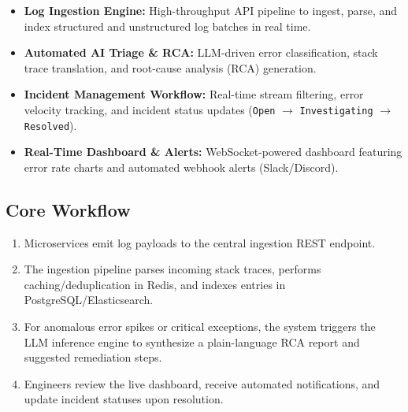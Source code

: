 \documentclass[11pt,a4paper]{article}
\begin{document}
\begin{itemize}[leftmargin=0.7cm]

\item \textbf{Log Ingestion Engine:} High-throughput API pipeline to ingest, parse, and index structured and unstructured log batches in real time.

\item \textbf{Automated AI Triage \& RCA:} LLM-driven error classification, stack trace translation, and root-cause analysis (RCA) generation.

\item \textbf{Incident Management Workflow:} Real-time stream filtering, error velocity tracking, and incident status updates (\texttt{Open} $\rightarrow$ \texttt{Investigating} $\rightarrow$ \texttt{Resolved}).

\item \textbf{Real-Time Dashboard \& Alerts:} WebSocket-powered dashboard featuring error rate charts and automated webhook alerts (Slack/Discord).

\end{itemize}


\subsection{Core Workflow}

\begin{enumerate}[leftmargin=0.7cm]

\item Microservices emit log payloads to the central ingestion REST endpoint.

\item The ingestion pipeline parses incoming stack traces, performs caching/deduplication in Redis, and indexes entries in PostgreSQL/Elasticsearch.

\item For anomalous error spikes or critical exceptions, the system triggers the LLM inference engine to synthesize a plain-language RCA report and suggested remediation steps.

\item Engineers review the live dashboard, receive automated notifications, and update incident statuses upon resolution.

\end{enumerate}
\end{document}
